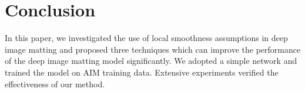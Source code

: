\documentclass{article}
\theoremstyle{plain}
\begin{document}
\section{Conclusion}
In this paper, 
    we investigated the use of local smoothness assumptions in deep image matting and proposed three techniques which can improve the performance of the deep image matting model significantly.
    We adopted a simple network and trained the model on AIM training data.
    Extensive experiments verified the effectiveness of our method.










\end{document}
